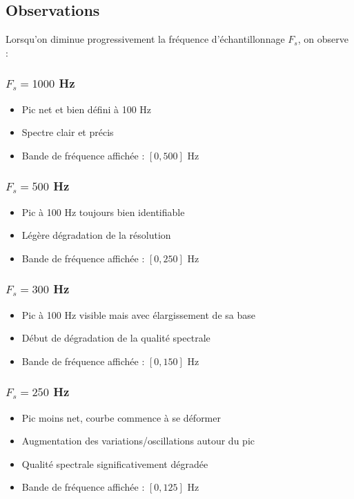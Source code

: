 \documentclass[12pt,a4paper]{article}
\begin{document}
\subsection{Observations}

Lorsqu'on diminue progressivement la fréquence d'échantillonnage $F_s$, on observe :

\subsubsection{$F_s = 1000$ Hz}
\begin{itemize}
    \item Pic net et bien défini à 100 Hz
    \item Spectre clair et précis
    \item Bande de fréquence affichée : $[0, 500]$ Hz
\end{itemize}

\subsubsection{$F_s = 500$ Hz}
\begin{itemize}
    \item Pic à 100 Hz toujours bien identifiable
    \item Légère dégradation de la résolution
    \item Bande de fréquence affichée : $[0, 250]$ Hz
\end{itemize}

\subsubsection{$F_s = 300$ Hz}
\begin{itemize}
    \item Pic à 100 Hz visible mais avec élargissement de sa base
    \item Début de dégradation de la qualité spectrale
    \item Bande de fréquence affichée : $[0, 150]$ Hz
\end{itemize}

\subsubsection{$F_s = 250$ Hz}
\begin{itemize}
    \item Pic moins net, courbe commence à se déformer
    \item Augmentation des variations/oscillations autour du pic
    \item Qualité spectrale significativement dégradée
    \item Bande de fréquence affichée : $[0, 125]$ Hz
\end{itemize}
\end{document}
